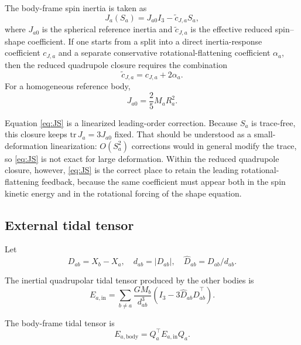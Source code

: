 \documentclass[journal, a4paper]{IEEEtran}
\begin{document}
The body-frame spin inertia is taken as
\begin{equation}
J_a(S_a)
=
J_{a0} I_3 - \tilde c_{J,a} S_a,
\label{eq:JS}
\end{equation}
where $J_{a0}$ is the spherical reference inertia and $\tilde c_{J,a}$ is the
effective reduced spin--shape coefficient. If one starts from a split into a
direct inertia-response coefficient $c_{J,a}$ and a separate conservative
rotational-flattening coefficient $\alpha_a$, then the reduced quadrupole
closure requires the combination
\begin{equation}
\tilde c_{J,a}=c_{J,a}+2\alpha_a.
\label{eq:cJeff}
\end{equation}
For a homogeneous reference body,
\begin{equation}
J_{a0}=\frac{2}{5}M_aR_a^2.
\label{eq:J0}
\end{equation}

Equation \eqref{eq:JS} is a linearized leading-order correction. Because
$S_a$ is trace-free, this closure keeps $\mathrm{tr}\,J_a=3J_{a0}$ fixed. That
should be understood as a small-deformation linearization: $O(S_a^2)$
corrections would in general modify the trace, so \eqref{eq:JS} is not exact
for large deformation. Within the reduced quadrupole closure, however,
\eqref{eq:JS} is the correct place to retain the leading rotational-flattening
feedback, because the same coefficient must appear both in the spin kinetic
energy and in the rotational forcing of the shape equation.

\subsection{External tidal tensor}

Let
\begin{equation}
D_{ab}=X_b-X_a,
\quad
d_{ab}=|D_{ab}|,
\quad
\hat D_{ab}=D_{ab}/d_{ab}.
\label{eq:Dab}
\end{equation}

The inertial quadrupolar tidal tensor produced by the other bodies is
\begin{equation}
E_{a,\mathrm{in}}
=
\sum_{b\neq a}
\frac{G M_b}{d_{ab}^3}
\left(
I_3 - 3\hat D_{ab}\hat D_{ab}^\top
\right).
\label{eq:Ein}
\end{equation}

The body-frame tidal tensor is
\begin{equation}
E_{a,\mathrm{body}}
=
Q_a^\top E_{a,\mathrm{in}} Q_a.
\label{eq:Ebody}
\end{equation}
\end{document}
